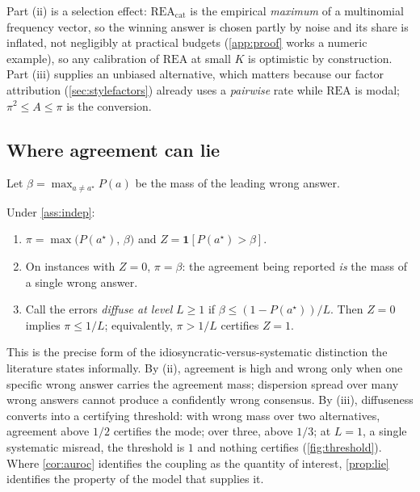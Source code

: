 \documentclass[11pt]{article}
\newcommand{\rea}{\mathrm{REA}}
\begin{document}
Part (ii) is a selection effect: $\rea_{\text{cat}}$ is the empirical \emph{maximum} of a multinomial frequency vector, so the winning answer is chosen partly by noise and its share is inflated, not negligibly at practical budgets (\cref{app:proof} works a numeric example), so any calibration of $\rea$ at small $K$ is optimistic by construction. Part (iii) supplies an unbiased alternative, which matters because our factor attribution (\cref{sec:stylefactors}) already uses a \emph{pairwise} rate while $\rea$ is modal; $\pi^2 \le A \le \pi$ is the conversion.

\subsection{Where agreement can lie}
\label{sec:wherelie}

Let $\beta = \max_{a \neq a^\star} P(a)$ be the mass of the leading wrong answer.

\begin{proposition}
\label{prop:lie}
Under \cref{ass:indep}:
\begin{enumerate}[label=(\roman*)]
\itemsep0em
\item $\pi = \max\big(P(a^\star),\,\beta\big)$ and $Z = \mathbf{1}[P(a^\star) > \beta]$.
\item On instances with $Z = 0$, $\pi = \beta$: the agreement being reported \emph{is} the mass of a single wrong answer.
\item Call the errors \emph{diffuse at level} $L \ge 1$ if $\beta \le (1 - P(a^\star))/L$. Then $Z = 0$ implies $\pi \le 1/L$; equivalently, $\pi > 1/L$ certifies $Z = 1$.
\end{enumerate}
\end{proposition}

This is the precise form of the idiosyncratic-versus-systematic distinction the literature states informally. By (ii), agreement is high and wrong only when one specific wrong answer carries the agreement mass; dispersion spread over many wrong answers cannot produce a confidently wrong consensus. By (iii), diffuseness converts into a certifying threshold: with wrong mass over two alternatives, agreement above $1/2$ certifies the mode; over three, above $1/3$; at $L{=}1$, a single systematic misread, the threshold is $1$ and nothing certifies (\cref{fig:threshold}). Where \cref{cor:auroc} identifies the coupling as the quantity of interest, \cref{prop:lie} identifies the property of the model that supplies it.
\end{document}
